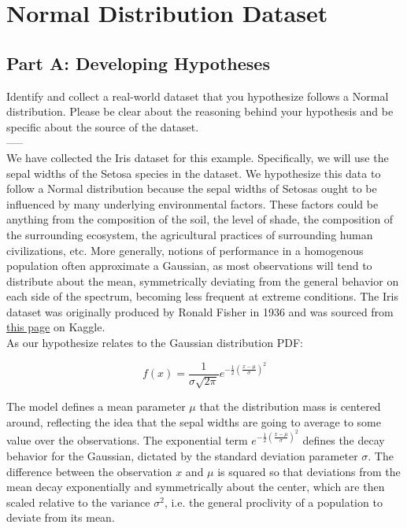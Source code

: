 \section{Normal Distribution Dataset}

\subsection{Part A: Developing Hypotheses}
Identify and collect a real-world dataset that you hypothesize follows a Normal distribution. Please be clear about the reasoning behind your hypothesis and be specific about the source of the dataset.\\
-----\\
We have collected the Iris dataset for this example. Specifically, we will use the sepal widths of the Setosa species in the dataset. We hypothesize this data to follow a Normal distribution because the sepal widths of Setosas ought to be influenced by many underlying environmental factors. These factors could be anything from the composition of the soil, the level of shade, the composition of the surrounding ecosystem, the agricultural practices of surrounding human civilizations, etc. More generally, notions of performance in a homogenous population often approximate a Gaussian, as most observations will tend to distribute about the mean, symmetrically deviating from the general behavior on each side of the spectrum, becoming less frequent at extreme conditions. The Iris dataset was originally produced by Ronald Fisher in 1936 and was sourced from \hyperlink{https://www.kaggle.com/datasets/uciml/iris}{this page} on Kaggle.\\

As our hypothesize relates to the Gaussian distribution PDF:

$$
f(x) = \frac{1}{\sigma \sqrt{2\pi}} e^{ -\frac{1}{2} \left( \frac{x - \mu}{\sigma} \right)^2 } 
$$

The model defines a mean parameter $ \mu $ that the distribution mass is centered around, reflecting the idea that the sepal widths are going to average to some value over the observations. The exponential term $ e^{ -\frac{1}{2} \left( \frac{x - \mu}{\sigma} \right)^2 } $ defines the decay behavior for the Gaussian, dictated by the standard deviation parameter $ \sigma $. The difference between the observation $ x $ and $ \mu $ is squared so that deviations from the mean decay exponentially and symmetrically about the center, which are then scaled relative to the variance $ \sigma^2 $, i.e. the general proclivity of a population to deviate from its mean.\\ 

